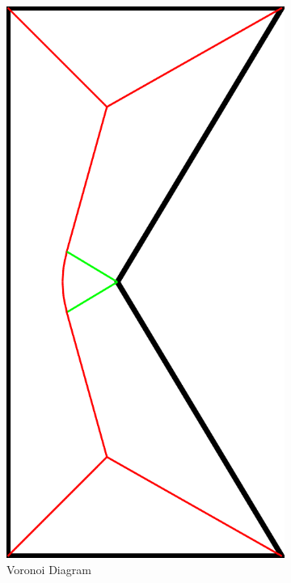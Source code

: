 \begin{figure}
\begin{subfigure}[t]{\figwidth}
\end{subfigure}
\begin{subfigure}[t]{\figwidth}\centering
\includegraphics[height=\figwidthTwo]{sources-method-simple-skeleton-vd}
\caption{Voronoi Diagram}\label{shape_decomposition_vd}
\end{subfigure}
\begin{subfigure}[t]{\figwidth}\centering

\end{subfigure}
\end{figure}
